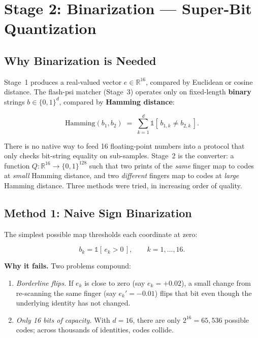 \documentclass[11pt]{article}
\begin{document}
\section{Stage 2: Binarization --- Super-Bit Quantization}

\subsection{Why Binarization is Needed}

Stage~1 produces a real-valued vector $e \in \mathbb{R}^{16}$, compared by Euclidean or
cosine distance. The flash-psi matcher (Stage~3) operates only on fixed-length
\textbf{binary} strings $b \in \{0,1\}^{d}$, compared by \textbf{Hamming distance}:

\begin{equation}
\mathrm{Hamming}(b_1, b_2) \;=\; \sum_{k=1}^{d} \mathbb{1}[\,b_{1,k} \neq b_{2,k}\,].
\end{equation}

There is no native way to feed 16 floating-point numbers into a protocol that only checks
bit-string equality on sub-samples. Stage~2 is the converter: a function
$Q : \mathbb{R}^{16} \to \{0,1\}^{128}$ such that two prints of the \emph{same} finger map
to codes at \emph{small} Hamming distance, and two \emph{different} fingers map to codes at
\emph{large} Hamming distance. Three methods were tried, in increasing order of quality.

\subsection{Method 1: Naive Sign Binarization}

The simplest possible map thresholds each coordinate at zero:

\begin{equation}
b_k = \mathbb{1}[\,e_k > 0\,], \qquad k = 1,\ldots,16.
\end{equation}

\textbf{Why it fails.} Two problems compound:

\begin{enumerate}[noitemsep]
\item \emph{Borderline flips.} If $e_k$ is close to zero (say $e_k = +0.02$), a small
change from re-scanning the same finger (say $e_k' = -0.01$) flips that bit even though the
underlying identity has not changed.
\item \emph{Only 16 bits of capacity.} With $d=16$, there are only $2^{16}=65{,}536$
possible codes; across thousands of identities, codes collide.
\end{enumerate}
\end{document}
